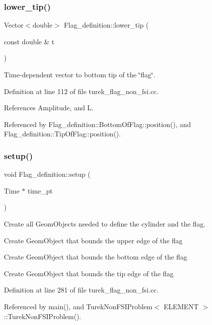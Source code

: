 \subsubsection{\texorpdfstring{lower\+\_\+tip()}{lower\_tip()}}
{\footnotesize\ttfamily Vector$<$double$>$ Flag\+\_\+definition\+::lower\+\_\+tip (\begin{DoxyParamCaption}\item[{const double \&}]{t }\end{DoxyParamCaption})}



Time-\/dependent vector to bottom tip of the \char`\"{}flag\char`\"{}. 



Definition at line 112 of file turek\+\_\+flag\+\_\+non\+\_\+fsi.\+cc.



References Amplitude, and L.



Referenced by Flag\+\_\+definition\+::\+Bottom\+Of\+Flag\+::position(), and Flag\+\_\+definition\+::\+Tip\+Of\+Flag\+::position().

\mbox{\label{namespaceFlag__definition_a61a03bffd4a34950ef9892be53c49f89}} 
\subsubsection{\texorpdfstring{setup()}{setup()}}
{\footnotesize\ttfamily void Flag\+\_\+definition\+::setup (\begin{DoxyParamCaption}\item[{Time $\ast$}]{time\+\_\+pt }\end{DoxyParamCaption})}



Create all Geom\+Objects needed to define the cylinder and the flag. 

Create Geom\+Object that bounds the upper edge of the flag

Create Geom\+Object that bounds the bottom edge of the flag

Create Geom\+Object that bounds the tip edge of the flag 

Definition at line 281 of file turek\+\_\+flag\+\_\+non\+\_\+fsi.\+cc.



Referenced by main(), and Turek\+Non\+F\+S\+I\+Problem$<$ E\+L\+E\+M\+E\+N\+T $>$\+::\+Turek\+Non\+F\+S\+I\+Problem().

